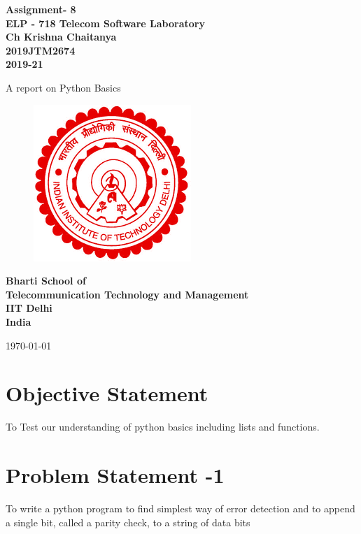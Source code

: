 \documentclass[12pt]{article}
\begin{document}
  \begin{titlepage}
    \begin{center}
      \begin{Large}
      \textbf{ Assignment- 8\\
       \vspace*{0.5cm}
       ELP - 718 Telecom Software Laboratory\\
       \vspace{1cm}
       Ch Krishna Chaitanya\\
       2019JTM2674\\
       2019-21\\}
      \end{Large}
       \vspace{1cm}
      {\Large  A report on Python Basics}
       \vfill
       \begin{figure}[h!]
          \centering
          \includegraphics{iitdelhi.png}
       \end{figure}
       \vfill
      \begin{Large}
      \textbf{ Bharti School of \\
       Telecommunication Technology and Management\\
       IIT Delhi\\
       India\\
      }\end{Large}
       \medskip
       \today
    \end{center}
    \vfill
  \end{titlepage}
  
  \tableofcontents
  
  \clearpage
  \section*{Objective Statement}
   To Test our understanding of python basics including lists and functions.

  \section{Problem Statement -1}
 To write a python program to find simplest way of error detection and to append a single bit, called a parity check, to a string of data bits
\end{document}
